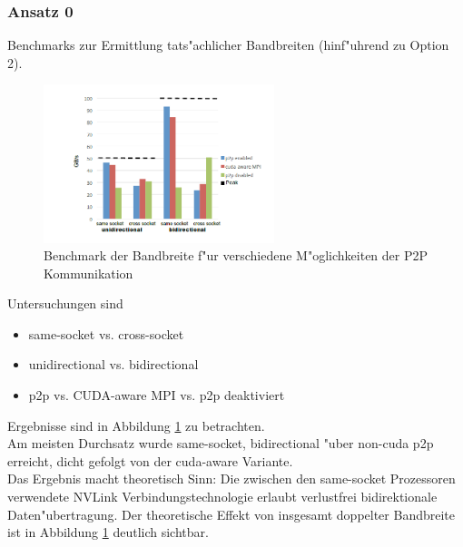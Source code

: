 \subsubsection{Ansatz 0}
Benchmarks zur Ermittlung tats"achlicher Bandbreiten (hinf"uhrend zu Option 2).
\begin{figure}
\centering
\includegraphics[width=0.6\textwidth]{res/bench0.png}
\caption{\cite[Abb. 4]{mainpaper} Benchmark der Bandbreite f"ur verschiedene M"oglichkeiten der P2P Kommunikation}
	\label{fig:bench0}
\end{figure}
Untersuchungen sind
\begin{itemize}
	\item same-socket vs. cross-socket
	\item unidirectional vs. bidirectional
	\item p2p vs. CUDA-aware MPI vs. p2p deaktiviert
\end{itemize}
Ergebnisse sind in Abbildung \ref{fig:bench0} zu betrachten.\\
Am meisten Durchsatz wurde same-socket, bidirectional "uber non-cuda p2p erreicht, dicht gefolgt von der cuda-aware Variante.\\
Das Ergebnis macht theoretisch Sinn: Die zwischen den same-socket Prozessoren verwendete NVLink Verbindungstechnologie erlaubt verlustfrei bidirektionale Daten"ubertragung. Der theoretische Effekt von insgesamt doppelter Bandbreite ist in Abbildung \ref{fig:bench0} deutlich sichtbar.\\


